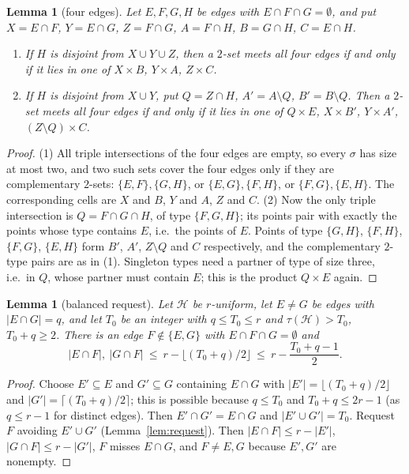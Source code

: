 \documentclass[11pt]{amsart}
\newtheorem{lemma}[theorem]{Lemma}
\theoremstyle{definition}
\theoremstyle{remark}
\newcommand{\cH}{\mathcal H}
\newcommand{\ceil}[1]{\lceil #1\rceil}
\newcommand{\floor}[1]{\lfloor #1\rfloor}
\begin{document}
\begin{lemma}[four edges]\label{lem:cand4}
Let $E,F,G,H$ be edges with $E\cap F\cap G=\emptyset$, and put $X=E\cap F$, $Y=E\cap G$, $Z=F\cap G$, $A=F\cap H$, $B=G\cap H$, $C=E\cap H$.
\begin{enumerate}
\item If $H$ is disjoint from $X\cup Y\cup Z$, then a $2$-set meets all four edges if and only if it lies in one of $X\times B$, $Y\times A$, $Z\times C$.
\item If $H$ is disjoint from $X\cup Y$, put $Q=Z\cap H$, $A'=A\setminus Q$, $B'=B\setminus Q$. Then a $2$-set meets all four edges if and only if it lies in one of $Q\times E$, $X\times B'$, $Y\times A'$, $(Z\setminus Q)\times C$.
\end{enumerate}
\end{lemma}
\begin{proof}
(1) All triple intersections of the four edges are empty, so every $\sigma$ has size at most two, and two such sets cover the four edges only if they are complementary $2$-sets: $\{E,F\},\{G,H\}$, or $\{E,G\},\{F,H\}$, or $\{F,G\},\{E,H\}$. The corresponding cells are $X$ and $B$, $Y$ and $A$, $Z$ and $C$.
(2) Now the only triple intersection is $Q=F\cap G\cap H$, of type $\{F,G,H\}$; its points pair with exactly the points whose type contains $E$, i.e.\ the points of $E$. Points of type $\{G,H\}$, $\{F,H\}$, $\{F,G\}$, $\{E,H\}$ form $B'$, $A'$, $Z\setminus Q$ and $C$ respectively, and the complementary $2$-type pairs are as in (1). Singleton types need a partner of type of size three, i.e.\ in $Q$, whose partner must contain $E$; this is the product $Q\times E$ again.
\end{proof}

\begin{lemma}[balanced request]\label{lem:balanced}
Let $\cH$ be $r$-uniform, let $E\ne G$ be edges with $|E\cap G|=q$, and let $T_0$ be an integer with $q\le T_0\le r$ and $\tau(\cH)>T_0$, $T_0+q\ge2$. There is an edge $F\notin\{E,G\}$ with $E\cap F\cap G=\emptyset$ and
\[
|E\cap F|,\ |G\cap F|\ \le\ r-\floor{(T_0+q)/2}\ \le\ r-\frac{T_0+q-1}{2}.
\]
\end{lemma}
\begin{proof}
Choose $E'\subseteq E$ and $G'\subseteq G$ containing $E\cap G$ with $|E'|=\floor{(T_0+q)/2}$ and $|G'|=\ceil{(T_0+q)/2}$; this is possible because $q\le T_0$ and $T_0+q\le 2r-1$ (as $q\le r-1$ for distinct edges). Then $E'\cap G'=E\cap G$ and $|E'\cup G'|=T_0$. Request $F$ avoiding $E'\cup G'$ (Lemma~\ref{lem:request}). Then $|E\cap F|\le r-|E'|$, $|G\cap F|\le r-|G'|$, $F$ misses $E\cap G$, and $F\ne E,G$ because $E',G'$ are nonempty.
\end{proof}
\end{document}
